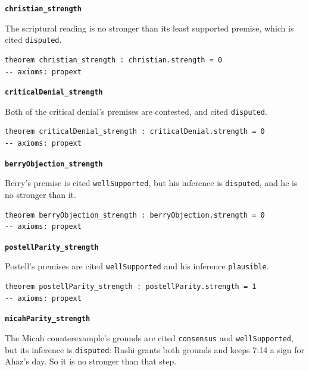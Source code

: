 \documentclass[11pt]{article}
\begin{document}
\par\medskip\noindent\textbf{\texttt{christian\_\allowbreak{}strength}}\par\nobreak\noindent
The scriptural reading is no stronger than its least supported premise, which is cited \texttt{disputed}.

{\small\begin{verbatim}
theorem christian_strength : christian.strength = 0
-- axioms: propext
\end{verbatim}}
\par\medskip\noindent\textbf{\texttt{critical\allowbreak{}Denial\_\allowbreak{}strength}}\par\nobreak\noindent
Both of the critical denial’s premises are contested, and cited \texttt{disputed}.

{\small\begin{verbatim}
theorem criticalDenial_strength : criticalDenial.strength = 0
-- axioms: propext
\end{verbatim}}
\par\medskip\noindent\textbf{\texttt{berry\allowbreak{}Objection\_\allowbreak{}strength}}\par\nobreak\noindent
Berry’s premise is cited \texttt{well\allowbreak{}Supported}, but his inference is \texttt{disputed}, and he is no stronger than it.

{\small\begin{verbatim}
theorem berryObjection_strength : berryObjection.strength = 0
-- axioms: propext
\end{verbatim}}
\par\medskip\noindent\textbf{\texttt{postell\allowbreak{}Parity\_\allowbreak{}strength}}\par\nobreak\noindent
Postell’s premises are cited \texttt{well\allowbreak{}Supported} and his inference \texttt{plausible}.

{\small\begin{verbatim}
theorem postellParity_strength : postellParity.strength = 1
-- axioms: propext
\end{verbatim}}
\par\medskip\noindent\textbf{\texttt{micah\allowbreak{}Parity\_\allowbreak{}strength}}\par\nobreak\noindent
The Micah counterexample’s grounds are cited \texttt{consensus} and \texttt{well\allowbreak{}Supported}, but its inference is \texttt{disputed}: Rashi grants both grounds and keeps 7:14 a sign for Ahaz’s day. So it is no stronger than that step.
\end{document}
